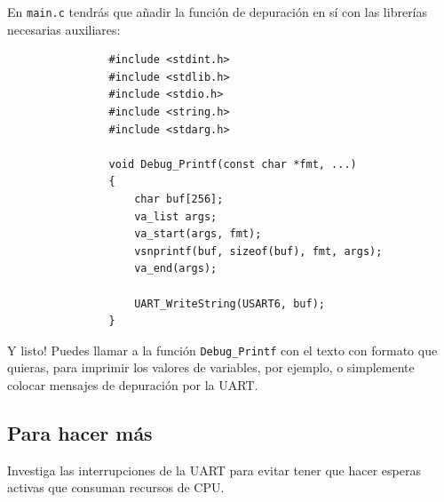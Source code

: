 \documentclass[../main.tex]{subfiles}
\begin{document}
            En \texttt{main.c} tendrás que añadir la función de depuración en sí con las librerías necesarias auxiliares:

            \begin{lstlisting}
                #include <stdint.h>
                #include <stdlib.h>
                #include <stdio.h>
                #include <string.h>
                #include <stdarg.h>

                void Debug_Printf(const char *fmt, ...)
                {
                    char buf[256];
                    va_list args;
                    va_start(args, fmt);
                    vsnprintf(buf, sizeof(buf), fmt, args);
                    va_end(args);

                    UART_WriteString(USART6, buf);
                }
            \end{lstlisting}

            Y listo! Puedes llamar a la función \texttt{Debug\_Printf} con el texto con formato que quieras, para imprimir los valores de variables, por ejemplo, o simplemente colocar mensajes de depuración por la UART.

    \subsection{Para hacer más}

        Investiga las interrupciones de la UART para evitar tener que hacer esperas activas que consuman recursos de CPU. 
\end{document}
